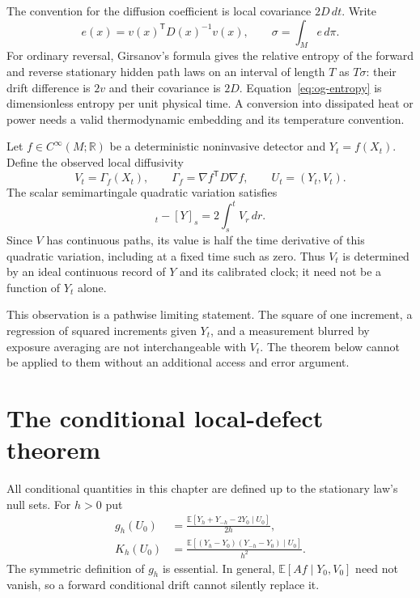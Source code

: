 The convention for the diffusion coefficient is local covariance $2D\,dt$.
Write
\begin{equation}
 e(x)=v(x)^{\mathsf T}D(x)^{-1}v(x),\qquad
 \sigma=\int_M e\,d\pi.
 \label{eq:og-entropy}
\end{equation}
For ordinary reversal, Girsanov's formula gives the relative entropy of the
forward and reverse stationary hidden path laws on an interval of length
$T$ as $T\sigma$: their drift difference is $2v$ and their covariance is
$2D$. Equation~\eqref{eq:og-entropy} is dimensionless entropy per unit
physical time. A conversion into dissipated heat or power needs a valid
thermodynamic embedding and its temperature convention.

Let $f\in C^\infty(M;\mathbb R)$ be a deterministic noninvasive detector and
$Y_t=f(X_t)$. Define the observed local diffusivity
\begin{equation}
 V_t=\Gamma_f(X_t),\qquad
 \Gamma_f=\nabla f^{\mathsf T}D\nabla f,
 \qquad U_t=(Y_t,V_t).
 \label{eq:og-geometry}
\end{equation}
The scalar semimartingale quadratic variation satisfies
\begin{equation}
 [Y]_t-[Y]_s=2\int_s^t V_r\,dr.
 \label{eq:og-qv}
\end{equation}
Since $V$ has continuous paths, its value is half the time derivative of
this quadratic variation, including at a fixed time such as zero. Thus
$V_t$ is determined by an ideal continuous record of $Y$ and its calibrated
clock; it need not be a function of $Y_t$ alone.

This observation is a pathwise limiting statement. The square of one
increment, a regression of squared increments given $Y_t$, and a measurement
blurred by exposure averaging are not interchangeable with $V_t$. The
theorem below cannot be applied to them without an additional access and
error argument.

\section{The conditional local-defect theorem}

All conditional quantities in this chapter are defined up to the stationary
law's null sets. For $h>0$ put
\begin{align}
 g_h(U_0)
 &=\frac{\mathbb E[Y_h+Y_{-h}-2Y_0\mid U_0]}{2h},\\
 K_h(U_0)
 &=\frac{\mathbb E[(Y_h-Y_0)(Y_{-h}-Y_0)\mid U_0]}{h^2}.
 \label{eq:og-conditional-finite-h}
\end{align}
The symmetric definition of $g_h$ is essential. In general,
$\mathbb E[Af\mid Y_0,V_0]$ need not vanish, so a forward conditional
drift cannot silently replace it.


